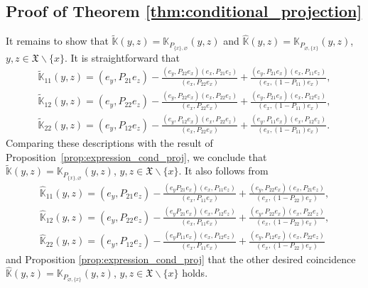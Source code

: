 \documentclass[11pt]{article}
\numberwithin{equation}{section}
\numberwithin{equation}{section}
\newcommand{\mfrak}[1]{\mathfrak{#1}}
\newcommand{\mbb}[1]{\mathbb{#1}}
\newcommand{\what}[1]{\widehat{#1}}
\begin{document}
\subsection{Proof of Theorem \ref{thm:conditional_projection}}
It remains to show that $\widetilde{\mbb{K}}(y,z)=\mbb{K}_{P_{\{x\},\varnothing}}(y,z)$ and $\what{\mbb{K}}(y,z)=\mbb{K}_{P_{\varnothing,\{x\}}}(y,z)$, $y,z\in \mfrak{X}\backslash\{x\}$.
It is straightforward that
\begin{gather*}
\widetilde{\mbb{K}}_{11}(y,z)=(e_{y},P_{21}e_{z})-\frac{(e_{y},P_{22}e_{x})(e_{x},P_{21}e_{z})}{(e_{x},P_{22}e_{x})}+\frac{(e_{y},P_{21}e_{x})(e_{x},P_{11}e_{z})}{(e_{x},(1-P_{11})e_{x})}, \\
\widetilde{\mbb{K}}_{12}(y,z)=(e_{y},P_{22}e_{z})-\frac{(e_{y},P_{22}e_{x})(e_{x},P_{22}e_{z})}{(e_{x},P_{22}e_{x})}+\frac{(e_{y},P_{21}e_{x})(e_{x},P_{12}e_{z})}{(e_{x},(1-P_{11})e_{x})}, \\
\widetilde{\mbb{K}}_{22}(y,z)=(e_{y},P_{12}e_{z})-\frac{(e_{y},P_{12}e_{x})(e_{x},P_{22}e_{z})}{(e_{x},P_{22}e_{x})}+\frac{(e_{y},P_{11}e_{x})(e_{x},P_{12}e_{z})}{(e_{x},(1-P_{11})e_{x})}.
\end{gather*}
Comparing these descriptions with the result of Proposition~\ref{prop:expression_cond_proj}, we conclude that $\widetilde{\mbb{K}}(y,z)=\mbb{K}_{P_{\{x\},\varnothing}}(y,z)$, $y,z\in\mfrak{X}\backslash\{x\}$.
It also follows from
\begin{gather*}
\what{\mbb{K}}_{11}(y,z)=(e_{y},P_{21}e_{z})-\frac{(e_{y}P_{21}e_{x})(e_{x},P_{11}e_{z})}{(e_{x},P_{11}e_{x})}+\frac{(e_{y},P_{22}e_{x})(e_{x},P_{21}e_{z})}{(e_{x},(1-P_{22})e_{x})}, \\
\what{\mbb{K}}_{12}(y,z)=(e_{y},P_{22}e_{z})-\frac{(e_{y}P_{21}e_{x})(e_{x},P_{12}e_{z})}{(e_{x},P_{11}e_{x})}+\frac{(e_{y},P_{22}e_{x})(e_{x},P_{22}e_{z})}{(e_{x},(1-P_{22})e_{x})}, \\
\what{\mbb{K}}_{22}(y,z)=(e_{y},P_{12}e_{z})-\frac{(e_{y}P_{11}e_{x})(e_{x},P_{12}e_{z})}{(e_{x},P_{11}e_{x})}+\frac{(e_{y},P_{12}e_{x})(e_{x},P_{22}e_{z})}{(e_{x},(1-P_{22})e_{x})}
\end{gather*}
and Proposition \ref{prop:expression_cond_proj} that the other desired coincidence $\what{\mbb{K}}(y,z)=\mbb{K}_{P_{\varnothing,\{x\}}}(y,z)$, $y,z\in \mfrak{X}\backslash\{x\}$ holds.
\end{document}
